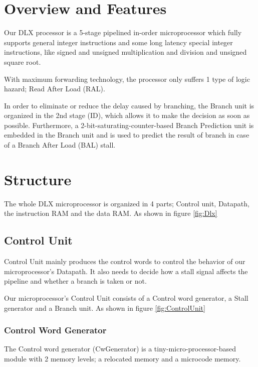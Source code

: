 

\chapter[Overview and Features]{Overview and Features}
Our DLX processor is a 5-stage pipelined in-order microprocessor which fully supports
general integer instructions and some long latency special integer instructions,
like signed and unsigned multiplication and division and unsigned square root.

With maximum forwarding technology, the processor only suffers 1 type of logic hazard; 
Read After Load (RAL).

In order to eliminate or reduce the delay caused by branching, the Branch unit is organized
in the 2nd stage (ID), which allows it to make the decision as soon as possible.
Furthermore, a 2-bit-saturating-counter-based Branch Prediction unit is embedded in the Branch unit and is used to
predict the result of branch in case of a Branch After Load (BAL) stall.

\chapter[Structure]{Structure}
The whole DLX microprocessor is organized in 4 parts; Control unit, Datapath,
the instruction RAM and the data RAM. As shown in figure \ref{fig:Dlx}

\section[Control Unit]{Control Unit}
Control Unit mainly produces the control words to control the behavior of our microprocessor's Datapath.
It also needs to decide how a stall signal affects the pipeline and whether a branch
is taken or not.

Our microprocessor's Control Unit consists of a Control word generator, a Stall generator and a Branch unit.
As shown in figure \ref{fig:ControlUnit}

\subsection[Control Word Generator]{Control Word Generator}
The Control word generator (CwGenerator) is a tiny-micro-processor-based module with 2 memory levels;
a relocated memory and a microcode memory.

